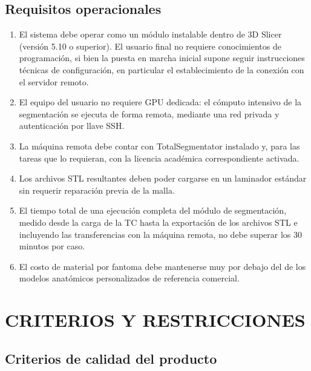 \subsection{Requisitos operacionales}

\begin{enumerate}
  \item El sistema debe operar como un módulo instalable dentro de 3D Slicer (versión 5.10 o superior). El usuario final no requiere conocimientos de programación, si bien la puesta en marcha inicial supone seguir instrucciones técnicas de configuración, en particular el establecimiento de la conexión con el servidor remoto.
  \item El equipo del usuario no requiere GPU dedicada: el cómputo intensivo de la segmentación se ejecuta de forma remota, mediante una red privada y autenticación por llave SSH.
  \item La máquina remota debe contar con TotalSegmentator instalado y, para las tareas que lo requieran, con la licencia académica correspondiente activada.
  \item Los archivos STL resultantes deben poder cargarse en un laminador estándar sin requerir reparación previa de la malla.
  \item El tiempo total de una ejecución completa del módulo de segmentación, medido desde la carga de la TC hasta la exportación de los archivos STL e incluyendo las transferencias con la máquina remota, no debe superar los 30 minutos por caso.
  \item El costo de material por fantoma debe mantenerse muy por debajo del de los modelos anatómicos personalizados de referencia comercial.
\end{enumerate}

\section{CRITERIOS Y RESTRICCIONES}

\subsection{Criterios de calidad del producto}

